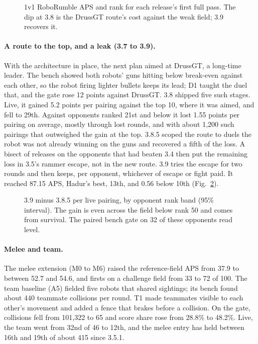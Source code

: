 \documentclass[10pt,twocolumn]{article}
\begin{document}
\begin{figure}[t]
\centering

\caption{1v1 RoboRumble APS and rank for each release's first full pass. The dip at 3.8 is the
DrussGT route's cost against the weak field; 3.9 recovers it.}
\label{fig:aps}
\end{figure}

\paragraph{A route to the top, and a leak (3.7 to 3.9).} With the architecture in place, the next
plan aimed at DrussGT, a long-time leader. The bench showed both robots' guns hitting below
break-even against each other, so the robot firing lighter bullets keeps its lead; D1 taught the
duel that, and the gate rose 12 points against DrussGT. 3.8 shipped five such stages. Live, it
gained 5.2 points per pairing against the top 10, where it was aimed, and fell to 29th. Against
opponents ranked 21st and below it lost 1.55 points per pairing on average, mostly through lost rounds,
and with about 1,200 such pairings that outweighed the gain at the top. 3.8.5 scoped the route to
duels the robot was not already winning on the guns and recovered a fifth of the loss. A bisect of
releases on the opponents that had beaten 3.4 then put the remaining loss in 3.5's rammer escape,
not in the new route. 3.9 tries the escape for two rounds and then keeps, per opponent, whichever
of escape or fight paid. It reached 87.15 APS, Hadur's best, 13th, and 0.56 below 10th
(Fig.~\ref{fig:bands}).

\begin{figure}[t]
\centering

\caption{3.9 minus 3.8.5 per live pairing, by opponent rank band (95\% interval). The gain is even
across the field below rank 50 and comes from survival. The paired bench gate on 32 of these
opponents read level.}
\label{fig:bands}
\end{figure}

\paragraph{Melee and team.} The melee extension (M0 to M6) raised the reference-field APS from
37.9 to between 52.7 and 54.6, and firsts on a challenge field from 33 to 72 of 100. The team
baseline (A5) fielded five robots that shared sightings; its bench found about 440 teammate
collisions per round. T1 made teammates visible to each other's movement and added a fence that
brakes before a collision. On the gate, collisions fell from 101,322 to 65 and score share rose
from 28.8\% to 48.2\%. Live, the team went from 32nd of 46 to 12th, and the melee entry has held
between 16th and 19th of about 415 since 3.5.1.
\end{document}
